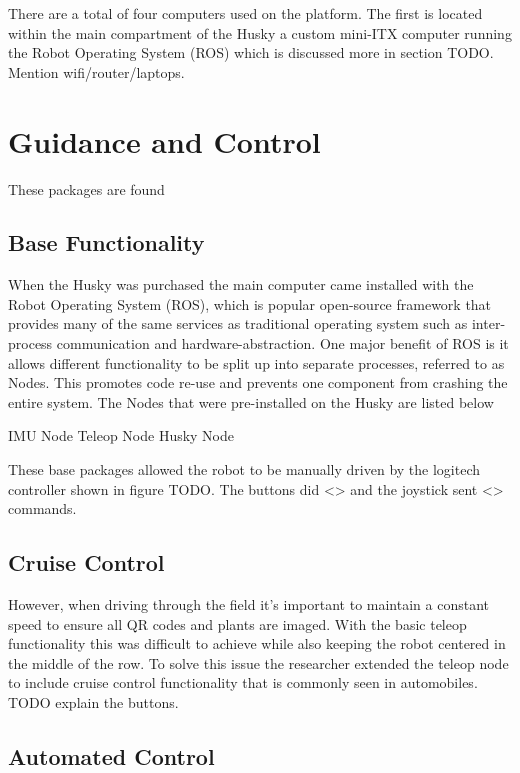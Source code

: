 There are a total of four computers used on the platform.  The first is located within the main compartment of the Husky a custom mini-ITX computer running the Robot Operating System (ROS) which is discussed more in section TODO.  
Mention wifi/router/laptops.  

\section{Guidance and Control}
\label{system-modes}

These packages are found 

\subsection{Base Functionality}

When the Husky was purchased the main computer came installed with the Robot Operating System (ROS), which is popular open-source framework that provides many of the same services as traditional operating system such as inter-process communication and hardware-abstraction.  One major benefit of ROS is it allows different functionality to be split up into separate processes, referred to as Nodes.  This promotes code re-use and prevents one component from crashing the entire system.   The Nodes that were pre-installed on the Husky are listed below

IMU Node
Teleop Node
Husky Node

These base packages allowed the robot to be manually driven by the logitech controller shown in figure TODO.  The buttons did <> and the joystick sent <> commands.  

\subsection{Cruise Control}

However, when driving through the field it's important to maintain a constant speed to ensure all QR codes and plants are imaged.  With the basic teleop functionality this was difficult to achieve while also keeping the robot centered in the middle of the row. To solve this issue the researcher extended the teleop node to include cruise control functionality that is commonly seen in automobiles.  TODO explain the buttons.  

\subsection{Automated Control}

